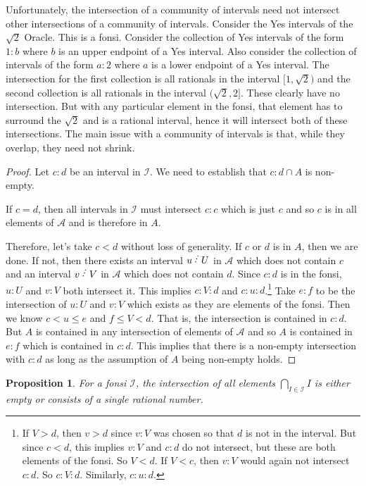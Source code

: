 \documentclass[12pt]{article}
\newtheorem{proposition}{Proposition}[subsection]
\begin{document}
Unfortunately, the intersection of a community of intervals need not intersect other intersections of a community of intervals. Consider the Yes intervals of the $\sqrt{2}$ Oracle. This is a fonsi. Consider the collection of Yes intervals of the form $1:b$ where $b$ is an upper endpoint of a Yes interval. Also consider the collection of intervals of the form $a:2$ where $a$ is a lower endpoint of a Yes interval. The intersection for the first collection is all rationals in the interval $[1, \sqrt{2})$ and the second collection is all rationals in the interval $(\sqrt{2}, 2]$. These clearly have no intersection. But with any particular element in the fonsi, that element has to surround the $\sqrt{2}$ and is a rational interval, hence it will intersect both of these intersections. The main issue with a community of intervals is that, while they overlap, they need not shrink. 

\begin{proof}
Let $c:d$ be an interval in $\mathcal{I}$. We need to establish that $c:d \cap A$ is non-empty. 

If $c=d$, then all intervals in $\mathcal{I}$ must intersect $c:c$ which is just $c$ and so $c$ is in all elements of $\mathcal{A}$ and is therefore in $A$.

Therefore, let's take $c < d$ without loss of generality. If $c$ or $d$ is in $A$, then we are done. If not, then there exists an interval $u\lte U$ in $\mathcal{A}$ which does not contain $c$ and an interval $v \lte V$ in $\mathcal{A}$ which does not contain $d$. Since $c:d$ is in the fonsi, $u:U$ and $v:V$ both intersect it. This implies $c : V : d$ and $c:u:d$.\footnote{ If $V > d$, then $v>d$ since $v:V$ was chosen so that $d$ is not in the interval. But since $c<d$, this implies $v:V$ and $c:d$ do not intersect, but these are both elements of the fonsi. So $V <d$. If $V < c$, then $v:V$ would again not intersect $c:d$. So $c:V:d$. Similarly, $c:u:d$. } Take $e:f$ to be the intersection of $u:U$ and $v:V$ which exists as they are elements of the fonsi. Then we know $c < u \leq e$ and $f \leq V < d$. That is, the intersection is contained in $c:d$. But $A$ is contained in any intersection of elements of $\mathcal{A}$ and so $A$ is contained in $e:f$ which is contained in $c:d$. This implies that there is a non-empty intersection with $c:d$ as long as the assumption of  $A$ being non-empty holds. 

\end{proof}

\begin{proposition}\label{pr:fon-unique-inter}
    For a fonsi $\mathcal I$, the intersection of all elements $\bigcap_{I \in \mathcal{I}} I$ is either empty or consists of a single rational number.
\end{proposition}
\end{document}
